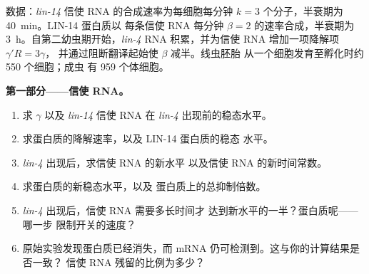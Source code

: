 \begin{problem}
\label{pb:b3:rna-regulation:1}
数据：\emph{lin-14} 信使 RNA 的合成速率为每细胞每分钟 $k = 3$
个分子，半衰期为 \qty{40}{min}。LIN-14 蛋白质以
每条信使 RNA 每分钟 $\beta = 2$ 的速率合成，半衰期为
\qty{3}{h}。自第二幼虫期开始，\emph{lin-4}
RNA 积累，并为信使 RNA 增加一项降解项 $\gamma' R = 3\gamma$，
并通过阻断翻译起始使 $\beta$ 减半。线虫胚胎
从一个细胞发育至孵化时约 \num{550} 个细胞；成虫
有 \num{959} 个体细胞。

\medskip
\noindent\textbf{第一部分——信使 RNA。}
\begin{enumerate}
  \item 求 $\gamma$ 以及 \emph{lin-14} 信使 RNA 在
        \emph{lin-4} 出现前的稳态水平。
  \item 求蛋白质的降解速率，以及 LIN-14 蛋白质的稳态
        水平。
  \item \emph{lin-4} 出现后，求信使 RNA 的新水平
        以及信使 RNA 的新时间常数。
  \item 求蛋白质的新稳态水平，以及
        蛋白质上的总抑制倍数。
  \item \emph{lin-4} 出现后，信使 RNA 需要多长时间才
        达到新水平的一半？蛋白质呢——哪一步
        限制开关的速度？
  \item 原始实验发现蛋白质已经消失，而 mRNA
        仍可检测到。这与你的计算结果是否一致？
        信使 RNA 残留的比例为多少？
\end{enumerate}


\end{problem}
